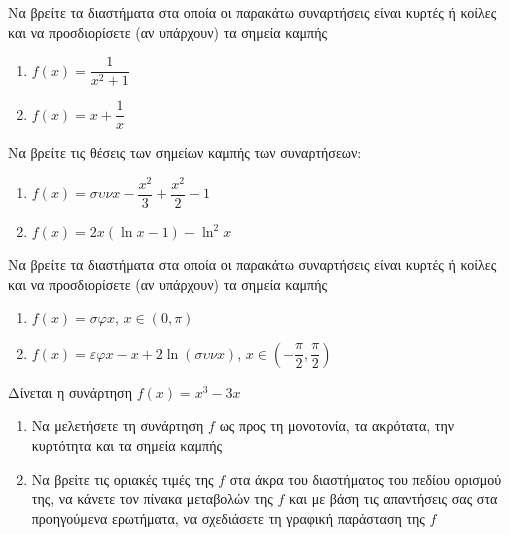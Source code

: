 \documentclass{presentation}
\begin{document}
\begin{askisi}
    Να βρείτε τα διαστήματα στα οποία οι παρακάτω συναρτήσεις είναι κυρτές ή κοίλες και να προσδιορίσετε (αν υπάρχουν) τα σημεία καμπής
    \begin{enumerate}
        \item<1-> $f(x)=\dfrac{1}{x^2+1}$
        \item<2-> $f(x)=x+\dfrac{1}{x}$
    \end{enumerate}

\end{askisi}

\begin{askisi}
    Να βρείτε τις θέσεις των σημείων καμπής των συναρτήσεων:
    \begin{enumerate}
        \item<1-> $f(x)=συνx-\dfrac{x^2}{3}+\dfrac{x^2}{2}-1$
        \item<2-> $f(x)=2x(\ln x-1)-\ln^2x$
    \end{enumerate}

\end{askisi}

\begin{askisi}
    Να βρείτε τα διαστήματα στα οποία οι παρακάτω συναρτήσεις είναι κυρτές ή κοίλες και να προσδιορίσετε (αν υπάρχουν) τα σημεία καμπής
    \begin{enumerate}
        \item<1-> $f(x)=σφx$, $x\in (0,\pi)$
        \item<2-> $f(x)=εφx-x+2\ln (συνx)$, $x\in (-\dfrac{\pi}{2},\dfrac{\pi}{2})$
    \end{enumerate}

\end{askisi}

\begin{askisi}
    Δίνεται η συνάρτηση $f(x)=x^3-3x$
    \begin{enumerate}
        \item<1-> Να μελετήσετε τη συνάρτηση $f$ ως προς τη μονοτονία, τα ακρότατα, την κυρτότητα και τα σημεία καμπής
        \item<2-> Να βρείτε τις οριακές τιμές της $f$ στα άκρα του διαστήματος του πεδίου ορισμού της, να κάνετε τον πίνακα μεταβολών της $f$ και με βάση τις απαντήσεις σας στα προηγούμενα ερωτήματα, να σχεδιάσετε τη γραφική παράσταση της $f$
    \end{enumerate}

\end{askisi}
\end{document}
